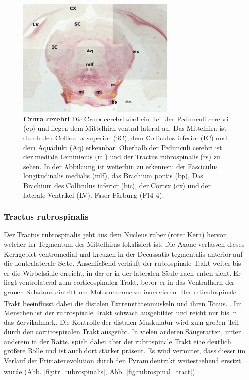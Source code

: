 \documentclass[12pt,a4paper,pdftex]{article}
\begin{document}
\begin{figure}[H]
    \centering
    \includegraphics[width=0.7\textwidth]{pictures/Bilder_Laura/cerebral_peduncle_F14_4P_025x.png}
    \caption[Crura cerebri]{\textbf{Crura cerebri} Die Crura cerebri sind ein Teil der Pedunculi cerebri (cp) und liegen dem Mittelhirn ventral-lateral an. Das Mittelhirn ist durch den Colliculus superior (SC), dem Colliculus inferior (IC) und dem Aquädukt (Aq) erkennbar. Oberhalb der Pedunculi cerebri ist der mediale Leminiscus (ml) und der Tractus rubrospinalis (rs) zu sehen. In der Abbildung ist weiterhin zu erkennen: der Fasciculus longitudinalis medialis (mlf), das Brachium pontis (bp), Das Brachium des Colliculus inferior (bic), der Cortex (cx) und der laterale Ventrikel (LV). Faser-Färbung (F14-4).}
    \label{fig:crura_cerebri}
\end{figure}

\subsubsection{Tractus rubrospinalis} 
Der Tractus rubrospinalis geht aus dem Nucleus ruber (roter Kern) hervor, welcher im Tegmentum des Mittelhirns lokalisiert ist. Die Axone verlassen dieses Kerngebiet ventromedial und kreuzen in der Decussatio tegmentalis anterior auf die kontralaterale Seite. Anschließend verläuft der rubrospinale Trakt weiter bis er die Wirbelsäule erreicht, in der er in der lateralen Säule nach unten zieht. Er liegt ventrolateral zum corticospinalen Trakt, bevor er in das Ventralhorn der grauen Substanz eintritt um Motorneurone zu innervieren. Der reticulospinale Trakt beeinflusst dabei die distalen Extremitätenmuskeln und ihren Tonus.  \textsuperscript{\cite[8]{crossman2014neuroanatomy}}. Im Menschen ist der rubrospinale Trakt schwach ausgebildet und reicht nur bis in das Zervikalmark. Die Kontrolle der distalen Muskulatur wird zum großen Teil durch den corticospinalen Trakt ausgeübt. In vielen anderen Säugerarten, unter anderem in der Ratte, spielt dabei aber der rubrospinale Trakt eine deutlich größere Rolle und ist auch dort stärker präsent. Es wird vermutet, dass dieser im Verlauf der Primatenevolution durch den Pyramidentrakt weitestgehend ersetzt wurde \textsuperscript{\cite[14]{neurowissenschaften_baer}} (Abb. \ref{fig:tr_rubrospinalis}, Abb. \ref{fig:rubrospinal_tract}).    
\end{document}
